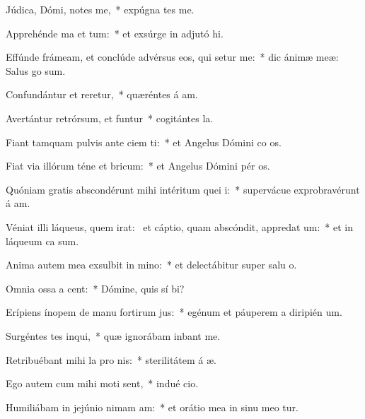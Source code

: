 \item Júdica, Dómi, notes me,~* expúgna tes me.
\item Apprehénde ma et tum:~* et exsúrge in adjutó hi.
\item Effúnde frámeam, et conclúde advérsus eos, qui setur me:~* dic ánimæ meæ: Salus  go sum.
\item Confundántur et reretur,~* quæréntes á am.
\item Avertántur retrórsum, et funtur~* cogitántes  la.
\item Fiant tamquam pulvis ante ciem ti:~* et Angelus Dómini co os.
\item Fiat via illórum téne et bricum:~* et Angelus Dómini pér os.
\item Quóniam gratis abscondérunt mihi intéritum quei i:~* supervácue exprobravérunt á am.
\item Véniat illi láqueus, quem irat:~\pscross{} et cáptio, quam abscóndit, appredat um:~* et in láqueum ca  sum.
\item Anima autem mea exsulbit in mino:~* et delectábitur super salu o.
\item Omnia ossa a cent:~* Dómine, quis sí bi?
\item Erípiens ínopem de manu fortirum jus:~* egénum et páuperem a diripién um.
\item Surgéntes tes inqui,~* quæ ignorábam inbant me.
\item Retribuébant mihi la pro nis:~* sterilitátem á æ.
\item Ego autem cum mihi moti sent,~* indué cio.
\item Humiliábam in jejúnio nimam am:~* et orátio mea in sinu meo tur.
